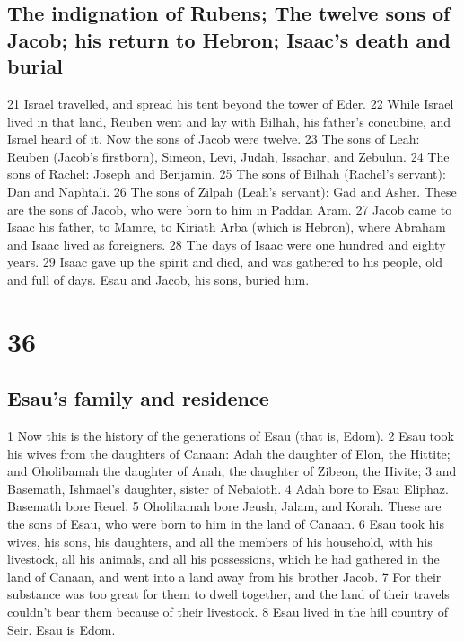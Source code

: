\hypertarget{the-indignation-of-rubens-the-twelve-sons-of-jacob-his-return-to-hebron-isaacs-death-and-burial}{%
\subsection{The indignation of Rubens; The twelve sons of Jacob; his
return to Hebron; Isaac's death and
burial}\label{the-indignation-of-rubens-the-twelve-sons-of-jacob-his-return-to-hebron-isaacs-death-and-burial}}

{21} Israel travelled, and spread his tent beyond the tower of Eder.
{22} While Israel lived in that land, Reuben went and lay with Bilhah,
his father's concubine, and Israel heard of it. Now the sons of Jacob
were twelve. {23} The sons of Leah: Reuben (Jacob's firstborn), Simeon,
Levi, Judah, Issachar, and Zebulun. {24} The sons of Rachel: Joseph and
Benjamin. {25} The sons of Bilhah (Rachel's servant): Dan and Naphtali.
{26} The sons of Zilpah (Leah's servant): Gad and Asher. These are the
sons of Jacob, who were born to him in Paddan Aram. {27} Jacob came to
Isaac his father, to Mamre, to Kiriath Arba (which is Hebron), where
Abraham and Isaac lived as foreigners. {28} The days of Isaac were one
hundred and eighty years. {29} Isaac gave up the spirit and died, and
was gathered to his people, old and full of days. Esau and Jacob, his
sons, buried him.

\hypertarget{section-35}{%
\section{36}\label{section-35}}

\hypertarget{esaus-family-and-residence}{%
\subsection{Esau's family and
residence}\label{esaus-family-and-residence}}

{1} Now this is the history of the generations of Esau (that is, Edom).
{2} Esau took his wives from the daughters of Canaan: Adah the daughter
of Elon, the Hittite; and Oholibamah the daughter of Anah, the daughter
of Zibeon, the Hivite; {3} and Basemath, Ishmael's daughter, sister of
Nebaioth. {4} Adah bore to Esau Eliphaz. Basemath bore Reuel. {5}
Oholibamah bore Jeush, Jalam, and Korah. These are the sons of Esau, who
were born to him in the land of Canaan. {6} Esau took his wives, his
sons, his daughters, and all the members of his household, with his
livestock, all his animals, and all his possessions, which he had
gathered in the land of Canaan, and went into a land away from his
brother Jacob. {7} For their substance was too great for them to dwell
together, and the land of their travels couldn't bear them because of
their livestock. {8} Esau lived in the hill country of Seir. Esau is
Edom.

